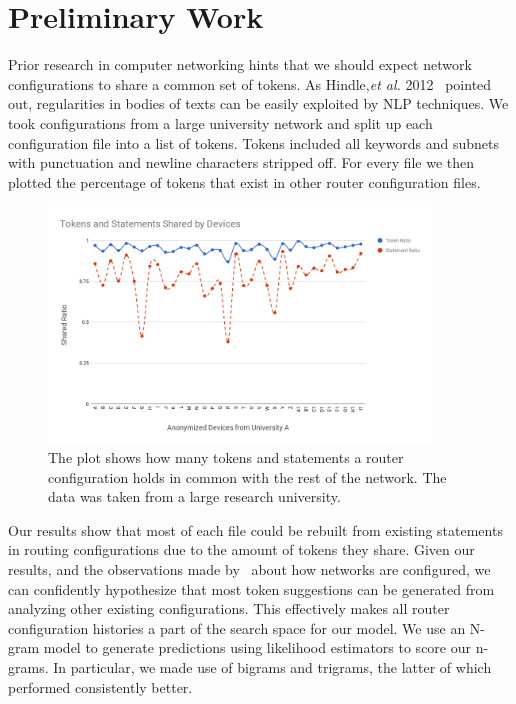 \section{Preliminary Work}

Prior research in computer networking hints that we should expect network configurations to share a common set of tokens. As Hindle,\textit{et al.} 2012~\cite{naturalness} pointed out, regularities in bodies of texts can be easily exploited by NLP techniques. We took configurations from a large university network and split up each configuration file into a list of tokens. Tokens included all keywords and subnets with punctuation and newline characters stripped off. For every file we then plotted the percentage of tokens that exist in other router configuration files.

\begin{figure}[H]
	\centering
	\includegraphics[width=4in]{chart.png}
	\caption{The plot shows how many tokens and statements a router configuration holds in common with the rest of the network. The data was taken from a large research university.}
\end{figure}

Our results show that most of each file could be rebuilt from existing statements in routing configurations due to the amount of tokens they share. Given our results, and the observations made by~\cite{complexity} about how networks are configured, we can confidently hypothesize that most token suggestions can be generated from analyzing other existing configurations. This effectively makes all router configuration histories a part of the search space for our model. We use an N-gram model to generate predictions using likelihood estimators to score our n-grams. In particular, we made use of bigrams and trigrams, the latter of which performed consistently better.

